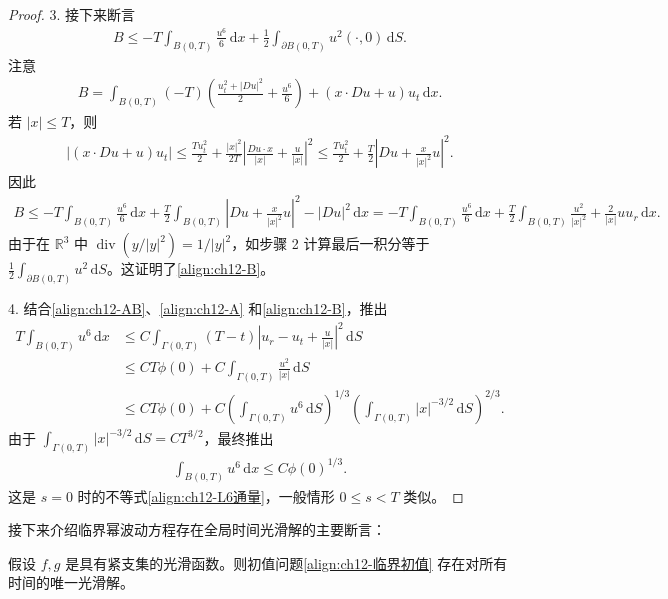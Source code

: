\documentclass[../../main.tex]{subfiles}
\begin{document}
\begin{proof}
3. 接下来断言
\begin{align}
B\leqslant -T\int_{B(0,T)}\frac{u^6}{6}\,\mathrm{d}x+\frac{1}{2}\int_{\partial B(0,T)}u^2(\cdot,0)\,\mathrm{d}S.
\label{align:ch12-B}
\end{align}
注意
\begin{align*}
B=\int_{B(0,T)}(-T)\left(\frac{u_t^2+|Du|^2}{2}+\frac{u^6}{6}\right)+(x\cdot Du+u)u_t\,\mathrm{d}x.
\end{align*}
若 $|x|\leqslant T$，则
\begin{align*}
|(x\cdot Du+u)u_t|\leqslant\frac{Tu_t^2}{2}+\frac{|x|^2}{2T}\left|\frac{Du\cdot x}{|x|}+\frac{u}{|x|}\right|^2\leqslant\frac{Tu_t^2}{2}+\frac{T}{2}\left|Du+\frac{x}{|x|^2}u\right|^2.
\end{align*}
因此
\begin{align*}
B\leqslant -T\int_{B(0,T)}\frac{u^6}{6}\,\mathrm{d}x+\frac{T}{2}\int_{B(0,T)}\left|Du+\frac{x}{|x|^2}u\right|^2-|Du|^2\,\mathrm{d}x=-T\int_{B(0,T)}\frac{u^6}{6}\,\mathrm{d}x+\frac{T}{2}\int_{B(0,T)}\frac{u^2}{|x|^2}+\frac{2}{|x|}uu_r\,\mathrm{d}x.
\end{align*}
由于在 $\mathbb{R}^3$ 中 $\operatorname{div}(y/|y|^2)=1/|y|^2$，如步骤 2 计算最后一积分等于 $\frac{1}{2}\int_{\partial B(0,T)}u^2\,\mathrm{d}S$。这证明了\eqref{align:ch12-B}。

4. 结合\eqref{align:ch12-AB}、\eqref{align:ch12-A} 和\eqref{align:ch12-B}，推出
\begin{align*}
T\int_{B(0,T)}u^6\,\mathrm{d}x
&\leqslant C\int_{\Gamma(0,T)}(T-t)\left|u_r-u_t+\frac{u}{|x|}\right|^2\,\mathrm{d}S\\
&\leqslant CT\phi(0)+C\int_{\Gamma(0,T)}\frac{u^2}{|x|}\,\mathrm{d}S\\
&\leqslant CT\phi(0)+C\left(\int_{\Gamma(0,T)}u^6\,\mathrm{d}S\right)^{1/3}
\left(\int_{\Gamma(0,T)}|x|^{-3/2}\,\mathrm{d}S\right)^{2/3}.
\end{align*}
由于 $\int_{\Gamma(0,T)}|x|^{-3/2}\,\mathrm{d}S=CT^{3/2}$，最终推出
\begin{align*}
\int_{B(0,T)}u^6\,\mathrm{d}x\leqslant C\phi(0)^{1/3}.
\end{align*}
这是 $s=0$ 时的不等式\eqref{align:ch12-L6通量}，一般情形 $0\leqslant s<T$ 类似。
\end{proof}

接下来介绍临界幂波动方程存在全局时间光滑解的主要断言：

\begin{theorem}[$u^5$ 非线性的全局存在性。]\label{theorem:ch12-u5全局存在}假设 $f,g$ 是具有紧支集的光滑函数。则初值问题\eqref{align:ch12-临界初值} 存在对所有时间的唯一光滑解。
\end{theorem}
\end{document}
